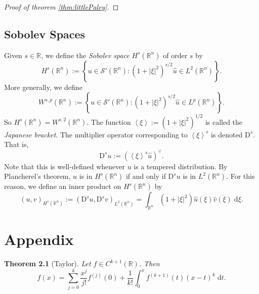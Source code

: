 \documentclass{book}
\newcommand{\scrS}{\mathscr{S}}
\newcommand{\bbR}{\mathbb{R}}
\renewcommand{\d}{\mathrm{d}}
\newcommand{\D}{\mathrm{D}}
\newcommand{\abs}[1]{\left\lvert {#1} \right\rvert}
\newcommand{\set}[1]{\left\{ {#1} \right\}}
\newcommand{\angles}[1]{\left\langle {#1} \right\rangle}
\newtheorem{theorem}{Theorem}[chapter]
\theoremstyle{definition}
\theoremstyle{remark}
\numberwithin{equation}{chapter}
\begin{document}
\begin{proof}[Proof of theorem \ref{thm:littlePaley}]
\end{proof}


\section{Sobolev Spaces}

Given $s \in \bbR$, we define the \textit{Sobolev space} $H^s(\bbR^n)$ of order $s$ by 
\begin{equation}
    H^s(\bbR^n) := \set{ u \in \scrS'(\bbR^n) : (1 + \abs{\xi}^2)^{s/2} \widehat{u} \in L^2(\bbR^n) }.
\end{equation}
More generally, we define 
\begin{equation}
    W^{s,p}(\bbR^n) := \set{ u \in \scrS'(\bbR^n) : (1 + \abs{\xi}^2)^{s/2} \widehat{u} \in L^p(\bbR^n) }.
\end{equation}
So $H^s(\bbR^n) = W^{s,2}(\bbR^n)$. The function $\angles{\xi} := (1 + \abs{\xi}^2)^{1/2}$ is called the \textit{Japanese bracket}. The multiplier operator corresponding to $\angles{\xi}^s$ is denoted $\D^s$. That is,
\begin{equation}
    \D^s u := (\angles{\xi}^s \widehat{u})^\vee.
\end{equation}
Note that this is well-defined whenever $u$ is a tempered distribution. By Plancherel's theorem, $u$ is in $H^s(\bbR^n)$ if and only if $\D^s u$ is in $L^2(\bbR^n)$. For this reason, we define an inner product on $H^s(\bbR^n)$ by 
\begin{equation}
    (u,v)_{H^s(\bbR^n)} 
    := (\D^s u, \D^s v)_{L^2(\bbR^n)}
    = \int_{\bbR^n} (1+\abs{\xi}^2) \widehat{u}(\xi) \overline{\widehat{v}(\xi)} \; \d{\xi}.
\end{equation}
 



\appendix
\chapter{Appendix}
\begin{theorem}[Taylor] \label{thm:taylor}
    Let $f \in C^{k+1}(\bbR)$. Then 
    \begin{equation}
        f(x) = \sum_{j=0}^k \frac{x^j}{j!} f^{(j)}(0) + \frac{1}{k!}\int_0^x f^{(k+1)}(t)(x-t)^{k} \; \d t.
    \end{equation}
\end{theorem}
\end{document}
